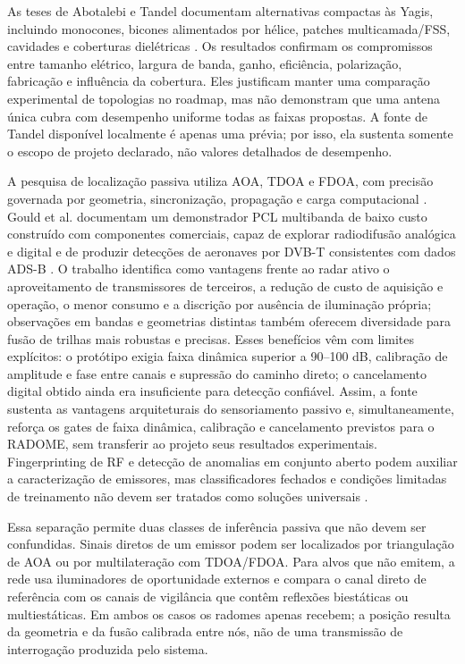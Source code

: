 As teses de Abotalebi e Tandel documentam alternativas compactas às Yagis, incluindo monocones, bicones alimentados por hélice, patches multicamada/FSS, cavidades e coberturas dielétricas \cite{abotalebi2023,tandel2024}. Os resultados confirmam os compromissos entre tamanho elétrico, largura de banda, ganho, eficiência, polarização, fabricação e influência da cobertura. Eles justificam manter uma comparação experimental de topologias no roadmap, mas não demonstram que uma antena única cubra com desempenho uniforme todas as faixas propostas. A fonte de Tandel disponível localmente é apenas uma prévia; por isso, ela sustenta somente o escopo de projeto declarado, não valores detalhados de desempenho.

A pesquisa de localização passiva utiliza AOA, TDOA e FDOA, com precisão governada por geometria, sincronização, propagação e carga computacional \cite{liu2019,pine2021}. Gould et al. documentam um demonstrador PCL multibanda de baixo custo construído com componentes comerciais, capaz de explorar radiodifusão analógica e digital e de produzir detecções de aeronaves por DVB-T consistentes com dados ADS-B \cite{gould2006multiband}. O trabalho identifica como vantagens frente ao radar ativo o aproveitamento de transmissores de terceiros, a redução de custo de aquisição e operação, o menor consumo e a discrição por ausência de iluminação própria; observações em bandas e geometrias distintas também oferecem diversidade para fusão de trilhas mais robustas e precisas. Esses benefícios vêm com limites explícitos: o protótipo exigia faixa dinâmica superior a 90--100 dB, calibração de amplitude e fase entre canais e supressão do caminho direto; o cancelamento digital obtido ainda era insuficiente para detecção confiável. Assim, a fonte sustenta as vantagens arquiteturais do sensoriamento passivo e, simultaneamente, reforça os gates de faixa dinâmica, calibração e cancelamento previstos para o RADOME, sem transferir ao projeto seus resultados experimentais. Fingerprinting de RF e detecção de anomalias em conjunto aberto podem auxiliar a caracterização de emissores, mas classificadores fechados e condições limitadas de treinamento não devem ser tratados como soluções universais \cite{soltanieh2020,jagannath2022,sun2022}.

Essa separação permite duas classes de inferência passiva que não devem ser confundidas. Sinais diretos de um emissor podem ser localizados por triangulação de AOA ou por multilateração com TDOA/FDOA. Para alvos que não emitem, a rede usa iluminadores de oportunidade externos e compara o canal direto de referência com os canais de vigilância que contêm reflexões biestáticas ou multiestáticas. Em ambos os casos os radomes apenas recebem; a posição resulta da geometria e da fusão calibrada entre nós, não de uma transmissão de interrogação produzida pelo sistema.

